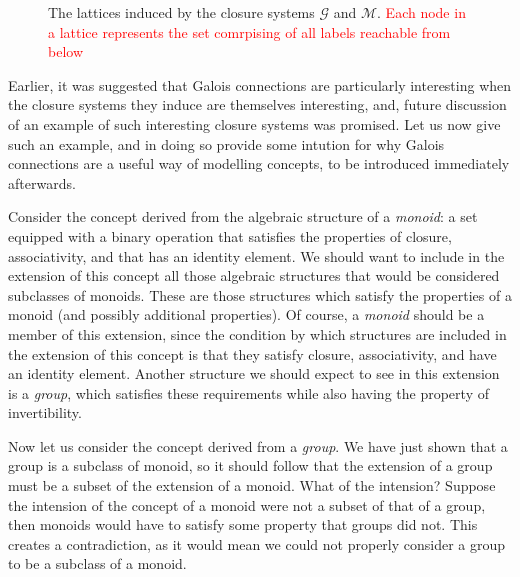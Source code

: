 \begin{figure}[H]
  \vspace{-6em}
  \caption{The lattices induced by the closure systems $\mathcal{G}$ and $\mathcal{M}$. \textcolor{red}{Each node in a lattice represents
  the set comrpising of all labels reachable from below}}
  \label{figure:two-lattices}
\end{figure}

Earlier, it was suggested that Galois connections are particularly interesting when the closure systems they induce are themselves interesting,
and, future discussion of an example of such interesting closure systems was promised. Let us now give such an example, and in doing so provide
some intution for why Galois connections are a useful way of modelling concepts, to be introduced immediately afterwards.

Consider the concept derived from the algebraic structure of a \textit{monoid}: a set equipped with a binary operation that satisfies the
properties of closure, associativity, and that has an identity element. We should want to include in the extension of this concept all those
algebraic structures that would be considered subclasses of monoids. These are those structures which satisfy the properties of a monoid (and
possibly additional properties). Of course, a \textit{monoid} should be a member of this extension, since the condition by which structures
are included in the extension of this concept is that they satisfy closure, associativity, and have an identity element. Another structure we
should expect to see in this extension is a \textit{group}, which satisfies these requirements while also having the property of invertibility.

Now let us consider the concept derived from a \textit{group}. We have just shown that a group is a subclass of monoid, so it should follow
that the extension of a group must be a subset of the extension of a monoid. What of the intension? Suppose the intension of the concept of
a monoid were not a subset of that of a group, then monoids would have to satisfy some property that groups did not. This creates a
contradiction, as it would mean we could not properly consider a group to be a subclass of a monoid.

